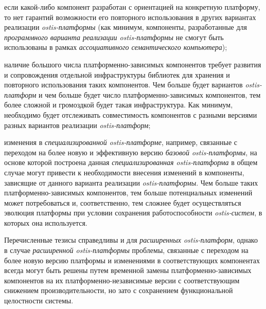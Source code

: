 \begin{SCn}
\begin{scnsubstruct}
{		\begin{scnitemize}
			\item если какой-либо компонент разработан с ориентацией на конкретную платформу, то нет гарантий возможности его повторного использования в других вариантах реализации \textit{ostis-платформы} (как минимум, компоненты, разработанные для \textit{программного варианта реализации ostis-платформы} не смогут быть использованы в рамках \textit{ассоциативного семантического компьютера});
			\item наличие большого числа платформенно-зависимых компонентов требует развития и сопровождения отдельной инфраструктуры библиотек для хранения и повторного использования таких компонентов. Чем больше будет вариантов \textit{ostis-платформ} и чем больше будет число платформенно-зависимых компонентов, тем более сложной и громоздкой будет такая инфраструктура. Как минимум, необходимо будет отслеживать совместимость компонентов с разными версиями разных вариантов реализации \textit{ostis-платформ};
			\item изменения в \textit{специализированной ostis-платформе}, например, связанные с переходом на более новую и эффективную версию \textit{базовой ostis-платформы}, на основе которой построена данная \textit{специализированная ostis-платформа} в общем случае могут привести к необходимости внесения изменений в компоненты, зависящие от данного варианта реализации \textit{ostis-платформы}. Чем больше таких платформенно-зависимых компонентов, тем больше потенциальных изменений может потребоваться и, соответственно, тем сложнее будет осуществляться эволюция платформы при условии сохранения работоспособности \textit{ostis-систем}, в которых она используется.
		\end{scnitemize} 
		
		Перечисленные тезисы справедливы и для \textit{расширенных ostis-платформ}, однако в случае \textit{расширенной ostis-платформы} проблемы, связанные с переходом на более новую версию платформы и изменениями в соответствующих компонентах всегда могут быть решены путем временной замены платформенно-зависимых компонентов на их платформенно-независимые версии с соответствующим снижением производительности, но зато с сохранением функциональной целостности системы.}
	

\end{scnsubstruct}
\end{SCn}
